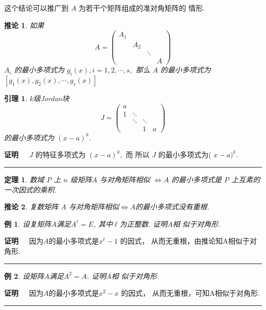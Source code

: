 \documentclass[13pt]{beamer}
\newtheorem{thm}{定理}
\newtheorem{lem}{引理}
\newtheorem{exa}{例}
\newtheorem*{coro}{推论}
\def\qed{\nopagebreak\hfill{\rule{4pt}{7pt}}\medbreak}
\def\pf{{\bf 证明~~ }}
\def\A{\mathscr{A}}
\begin{document}
\begin{frame}
这个结论可以推广到 $A$ 为若干个矩阵组成的准对角矩阵的 情形.
\begin{coro}
如果
\[
{A}=\left(\begin{array}{cccc}
{A}_{1} & & & \\
& {A}_{2} & & \\
& & \ddots & \\
& & & {A}
\end{array}\right)
\]
${A}_{i}$ 的最小多项式为 $g_{i}(x), i=1,2, \cdots, s,$ 那么 ${A}$ 的最小多项式为
$\left[g_{1}(x), g_{2}(x), \cdots, g_{s}(x)\right]$
\end{coro}
\end{frame}


\begin{frame}
\begin{lem}
$k$级Jordan块
\[
{J}=\left(\begin{array}{cccc}
a & & & \\
1 & \ddots & & \\
& \ddots & \ddots & \\
& & 1 & a
\end{array}\right)
\]
的最小多项式为 $(x-a)^{k}$.
\end{lem}
\pf 
${J}$ 的特征多项式为 $(x-a)^{k},$ 而
所以 $J$ 的最小多项式为( $x-a)^{k}$. 
\qed
\end{frame}


\begin{frame}

\begin{thm}
数域 $P$ 上 $n$ 级矩阵$A$ 与对角矩阵相似  $\Leftrightarrow A$ 的最小多项式是 $P$ 上互素的一次因式的乘积. 
\end{thm}
%

\begin{coro}
复数矩阵 $A$ 与对角矩阵相似$\Leftrightarrow  A$的最小多项式没有重根.
\end{coro}
\end{frame} 


\begin{frame}
\begin{exa}
设复矩阵$A$满足$A^\ell=E$, 其中$\ell$为正整数. 证明$A$相
似于对角形. 
\end{exa} 
\pf 因为$A$的最小多项式是$x^\ell-1$ 的因式，
从而无重根，由推论知A相似于对角形. 
\qed

\begin{exa}
	设矩阵$A$满足$A^{2}=A$. 证明$A$相
	似于对角形. 
\end{exa} 
\pf 因为$A$的最小多项式是$x^2-x$ 的因式，
从而无重根，可知A相似于对角形. 
\qed

\end{frame}
\end{document}
